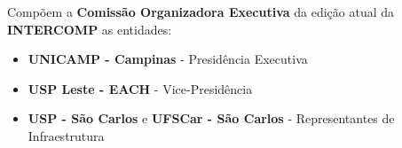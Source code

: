 
\begin{article}
	\label{art:comissao}
	Compõem a \textbf{Comissão Organizadora Executiva} da edição atual da \textbf{INTERCOMP} as entidades:
	\begin{itemize}[noitemsep]
		\item \textbf{UNICAMP - Campinas} - Presidência Executiva
		\item \textbf{USP Leste - EACH} - Vice-Presidência
		\item \textbf{USP - São Carlos} e \textbf{UFSCar - São Carlos} - Representantes de Infraestrutura
	\end{itemize}
\end{article}
